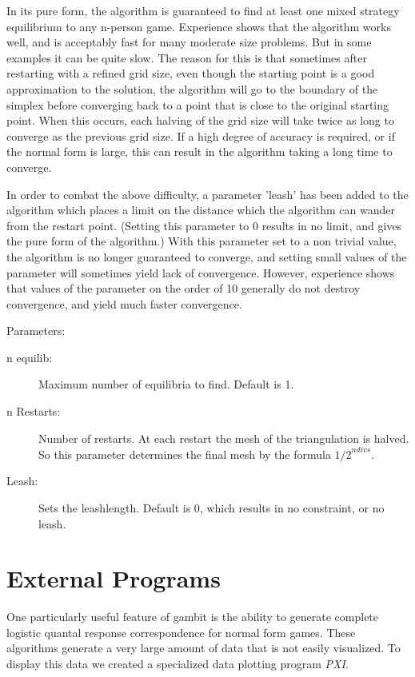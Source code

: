 In its pure form, the algorithm is guaranteed to find at least one
mixed strategy equilibrium to any n-person game.  Experience shows
that the algorithm works well, and is acceptably fast for many
moderate size problems.  But in some examples it can be quite slow.
The reason for this is that sometimes after restarting with a refined
grid size, even though the starting point is a good approximation to
the solution, the algorithm will go to the boundary of the simplex
before converging back to a point that is close to the original
starting point.  When this occurs, each halving of the grid size will
take twice as long to converge as the previous grid size.  If a high
degree of accuracy is required, or if the normal form is large, this
can result in the algorithm taking a long time to converge.

In order to combat the above difficulty, a parameter 'leash' has been
added to the algorithm which places a limit on the distance which the
algorithm can wander from the restart point. (Setting this parameter
to 0 results in no limit, and gives the pure form of the algorithm.)
With this parameter set to a non trivial value, the algorithm is no
longer guaranteed to converge, and setting small values of the
parameter will sometimes yield lack of convergence.  However,
experience shows that values of the parameter on the order of 10
generally do not destroy convergence, and yield much faster
convergence.

Parameters:

\begin{description}
\item[n equilib:] Maximum number of equilibria to find. Default is 1.  
\item[n Restarts:] Number of restarts.  At each restart the mesh of the
triangulation is halved.  So this parameter determines the final mesh
by the formula ${1/2}^{ndivs}$.
\item[Leash:] Sets the leashlength. Default is 0, which results in no
constraint, or no leash.  
\end{description}

\chapter{External Programs}
One particularly useful feature of gambit is the ability to generate complete 
logistic quantal response correspondence for normal form games.  These
algorithms generate a very large amount of data that is not easily visualized.
To display this data we created a specialized data plotting program {\em PXI}.


